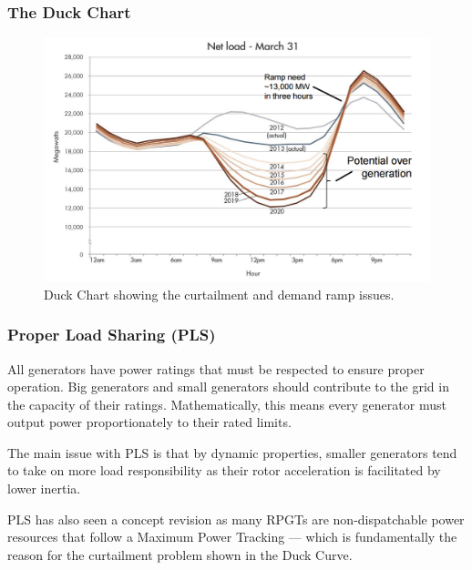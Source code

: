 \documentclass[10pt, compress,xcolor={svgnames,dvipsnames,x11names}]{beamer}
\begin{document}
\begin{frame}%
\frametitle{The Duck Chart}

\begin{figure}[htb]
	\begin{center}
		\includegraphics[width = .8\textwidth]{../images/presentation/duck.png}
		\caption{Duck Chart showing the curtailment and demand ramp issues.}
		\label{fig:duck}
	\end{center}
\end{figure}

\end{frame}%

\begin{frame}%
\frametitle{Proper Load Sharing (PLS)}

	All generators have power ratings that must be respected to ensure proper operation. Big generators and small generators should contribute to the grid in the capacity of their ratings. Mathematically, this means every generator must output power proportionately to their rated limits.

	The main issue with PLS is that by dynamic properties, smaller generators tend to take on more load responsibility as their rotor acceleration is facilitated by lower inertia.

	PLS has also seen a concept revision as many RPGTs are non-dispatchable power resources that follow a Maximum Power Tracking --- which is fundamentally the reason for the curtailment problem shown in the Duck Curve.

\end{frame}%


\end{document}
